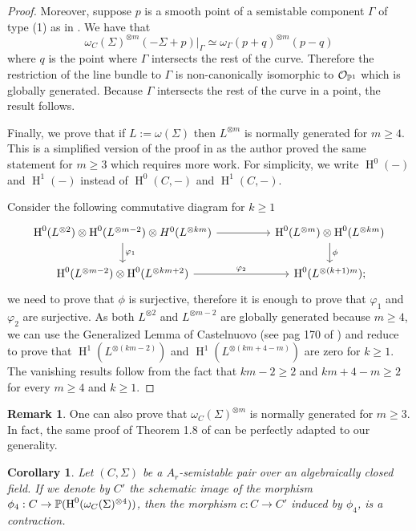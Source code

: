 \documentclass{alggeom}
\numberwithin{equation}{section}
\numberwithin{subsection}{section}
\newtheorem{corollary}[theorem]{Corollary}
\theoremstyle{definition}
\newtheorem{remark}[theorem]{Remark}
\theoremstyle{remark}
\newcommand\cO{\mathcal{O}} \newcommand\cP{\mathcal{P}}
\renewcommand\H{\operatorname{H}}
\begin{document}
\begin{proof}
	Moreover, suppose $p$ is a smooth point of a semistable component $\Gamma$ of type (1) as in .  We have that 
	$$\omega_C(\Sigma)^{\otimes m}(-\Sigma+p)\vert_{\Gamma}\simeq \omega_{\Gamma}(p+q)^{\otimes m}(p-q)$$
	where $q$ is the point where $\Gamma$ intersects the rest of the curve. Therefore the restriction of the line bundle to $\Gamma$ is non-canonically isomorphic to $\cO_{\PP^1}$ which is globally generated. Because $\Gamma$ intersects the rest of the curve in a point, the result follows. 
	
	Finally, we prove that if $L:=\omega(\Sigma)$ then $L^{\otimes m}$ is normally generated for $m \geq 4$. This is a simplified version of the proof in \cite{Knu} as the author proved the same statement for $m\geq 3$ which requires more work. For simplicity, we write $\H^0(-)$ and $\H^1(-)$ instead of $\H^0(C,-)$ and $\H^1(C,-)$.
	
	Consider the following commutative diagram for $k\geq 1$
	$$
	\begin{tikzcd}
		\H^0(L^{\otimes 2}) \otimes \H^{0}(L^{\otimes m-2}) \otimes H^0(L^{\otimes km}) \arrow[rr] \arrow[d, "\varphi_1"] &  & \H^0(L^{\otimes m})\otimes \H^0(L^{\otimes km}) \arrow[d, "\phi"] \\
		\H^0(L^{\otimes m-2}) \otimes \H^0(L^{\otimes km+2}) \arrow[rr, "\varphi_2"]                                      &  & \H^0(L^{\otimes (k+1)m});                                        
	\end{tikzcd}
	$$
	we need to prove that $\phi$ is surjective, therefore it is enough to prove that $\varphi_1$ and $\varphi_2$ are surjective. As both $L^{\otimes 2}$ and $L^{\otimes m-2}$ are globally generated because $m\geq 4$, we can use the Generalized Lemma of Castelnuovo (see pag 170 of \cite{Knu}) and reduce to prove that $\H^1(L^{\otimes (km-2)})$ and $\H^1(L^{\otimes (km+4-m)})$ are zero for $k\geq 1$. The vanishing results follow from the fact that $km-2\geq 2$ and $km+4-m \geq 2$ for every $m\geq 4$ and $k\geq 1$. 
	
\end{proof}

\begin{remark}
	One can also prove that $\omega_C(\Sigma)^{\otimes m}$ is normally generated for $m\geq 3$. In fact, the same proof of Theorem 1.8 of \cite{Knu} can be perfectly adapted to our generality.
\end{remark}

\begin{corollary}\label{cor:contrac-field}
    Let $(C,\Sigma)$ be a $A_r$-semistable pair over an algebraically closed field. If we denote by $C'$ the schematic image of the morphism $\phi_4:C\rightarrow \PP(\H^0(\omega_C(\Sigma)^{\otimes 4}))$, then the morphism $c:C \rightarrow C'$ induced by $\phi_4$, is a contraction.
\end{corollary}
\end{document}
